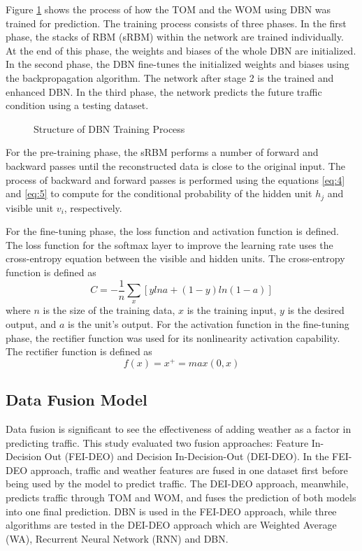 Figure \ref{fig:dbntraining} shows the process of how the TOM and the WOM using DBN was trained for prediction. The training process consists of three phases. In the first phase, the stacks of RBM (sRBM) within the network are trained individually. At the end of this phase, the weights and biases of the whole DBN are initialized. In the second phase, the DBN fine-tunes the initialized weights and biases using the backpropagation algorithm. The network after stage 2 is the trained and enhanced DBN. In the third phase, the network predicts the future traffic condition using a testing dataset.

\begin{figure}[h]
	\centering
	\captionsetup{justification=centering}
	\caption{Structure of DBN Training Process}
	\label{fig:dbntraining}
\end{figure}

For the pre-training phase, the sRBM performs a number of forward and backward passes until the reconstructed data is close to the original input. The process of backward and forward passes is performed using the equations \ref{eq:4} and \ref{eq:5} to compute for the conditional probability of the hidden unit $h_j$ and visible unit $v_i$, respectively.

For the fine-tuning phase, the loss function and activation function is defined.
The loss function for the softmax layer to improve the learning rate uses the cross-entropy equation between the visible and hidden units. The cross-entropy function is defined as
\begin{equation}
C = -\frac{1}{n}\sum_x [y ln a + (1 - y) ln (1-a)]
\end{equation}
\noindent where $n$ is the size of the training data, $x$ is the training input, $y$ is the desired output, and $a$ is the unit’s output.
For the activation function in the fine-tuning phase, the rectifier function was used for its nonlinearity activation capability. The rectifier function is defined as
\begin{equation}
f(x) = x^+ = max(0, x)
\end{equation}


\subsection{Data Fusion Model}
Data fusion is significant to see the effectiveness of adding weather as a factor in predicting traffic. This study evaluated two fusion approaches: Feature In-Decision Out (FEI-DEO) and Decision In-Decision-Out (DEI-DEO). In the FEI-DEO approach, traffic and weather features are fused in one dataset first before being used by the model to predict traffic. The DEI-DEO approach, meanwhile, predicts traffic through TOM and WOM, and fuses the prediction of both models into one final prediction. DBN is used in the FEI-DEO approach, while three algorithms are tested in the DEI-DEO approach which are Weighted Average (WA), Recurrent Neural Network (RNN) and DBN. 



